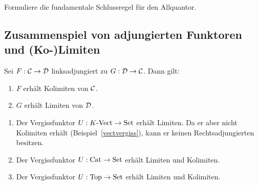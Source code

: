 \begin{aufg}Formuliere die fundamentale Schlussregel für den
Allquantor.\end{aufg}



\subsection{Zusammenspiel von adjungierten Funktoren und (Ko-)Limiten}

\begin{prop}\label{limitenbeiadjunktionen}%
Sei $F:\mathcal{C}\to\mathcal{D}$ linksadjungiert zu $G:\mathcal{D}\to\mathcal{C}$. Dann gilt:
\begin{enumerate}
\item $F$ erhält Kolimiten von $\mathcal{C}$.
\item $G$ erhält Limiten von $\mathcal{D}$.
\end{enumerate}
\end{prop}

\begin{bsp}\label{vergissstetig}
\begin{enumerate}
\item Der Vergissfunktor $U:{K\text{-}\mathrm{Vect}} \to \mathrm{Set}$ erhält Limiten.
Da er aber nicht Kolimiten erhält (Beispiel~\ref{vectvergiss}), kann er keinen
Rechtsadjungierten besitzen.
\item \label{vergisscat}Der Vergissfunktor $U:\mathrm{Cat} \to \mathrm{Set}$ erhält Limiten und Kolimiten.
\item Der Vergissfunktor $U:\mathrm{Top} \to \mathrm{Set}$ erhält Limiten und Kolimiten.
\end{enumerate}
\end{bsp}

